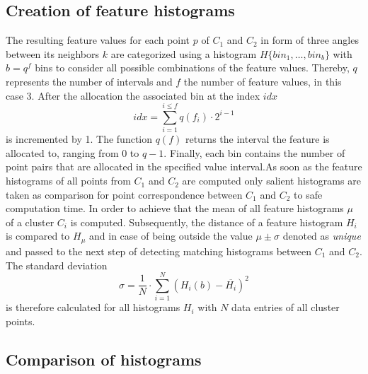 \subsection{Creation of feature histograms}
The resulting feature values for each point $p$ of $C_1$ and $C_2$ in form of three angles between its neighbors $k$ are categorized using a histogram $H \{bin_1,\ldots,bin_b\}$ with $b = q^f$ bins to consider all possible combinations of the feature values. Thereby, $q$ represents the number of intervals and $f$ the number of feature values, in this case 3. After the allocation the associated bin at the index $idx$
\begin{equation}
idx = \displaystyle\sum_{i=1}^{i \leq f}q(f_i) \cdot 2^{i-1}
\end{equation}
is incremented by 1. The function $q(f)$ returns the interval the feature is allocated to, ranging from 0 to $q - 1$. Finally, each bin contains the number of point pairs that are allocated in the specified value interval.As soon as the feature histograms of all points from $C_1$ and $C_2$ are computed only salient histograms are taken as comparison for point correspondence between $C_1$ and $C_2$ to safe computation time. In order to achieve that the mean of all feature histograms $\mu$ of a cluster $C_i$ is computed. Subsequently, the distance of a feature histogram $H_i$ is compared to $H_\mu$ and in case of being outside the value $\mu \pm \sigma$ denoted as \textit{unique} and passed to the next step of detecting matching histograms between $C_1$ and $C_2$. The standard deviation
\begin{equation}
\sigma = \frac{1}{N} \cdot \displaystyle\sum_{i=1}^{N}(H_i(b) - \overline{H_i})^2
\end{equation}
is therefore calculated for all histograms $H_i$ with $N$ data entries of all cluster points. 
\subsection{Comparison of histograms}
\label{histogramCriteria}

